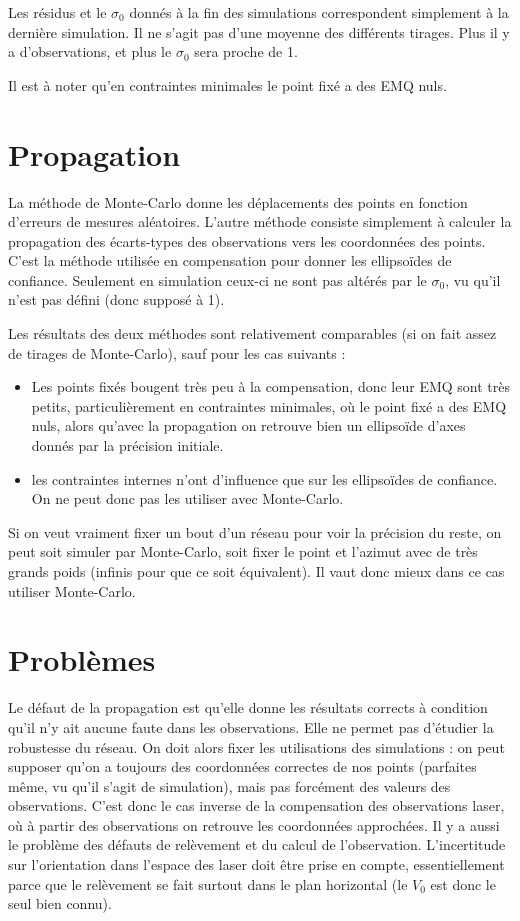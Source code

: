 \documentclass[french]{report}
\begin{document}
Les résidus et le $\sigma_0$ donnés à la fin des simulations correspondent simplement à la dernière simulation.
Il ne s'agit pas d'une moyenne des différents tirages. Plus il y a d'observations, et plus le $\sigma_0$ sera proche de 1.



Il est à noter qu'en contraintes minimales le point fixé a des EMQ nuls.

\section{Propagation}
La méthode de Monte-Carlo donne les déplacements des points en fonction d'erreurs de mesures aléatoires.
L'autre méthode consiste simplement à calculer la propagation des écarts-types des observations vers les coordonnées des points.
C'est la méthode utilisée en compensation pour donner les ellipsoïdes de confiance. Seulement en simulation
ceux-ci ne sont pas altérés par le $\sigma_0$, vu qu'il n'est pas défini (donc supposé à 1).

Les résultats des deux méthodes sont relativement comparables (si on fait assez de tirages de Monte-Carlo), sauf pour les cas suivants :
\begin{itemize}
 \item Les points fixés bougent très peu à la compensation, donc leur EMQ sont très petits, particulièrement en contraintes minimales, où le point
fixé a des EMQ nuls, alors qu'avec la propagation on retrouve bien un ellipsoïde d'axes donnés par la précision initiale.
 \item les contraintes internes n'ont d'influence que sur les ellipsoïdes de confiance. On ne peut donc pas les utiliser avec Monte-Carlo.
\end{itemize}

Si on veut vraiment fixer un bout d'un réseau pour voir la précision du reste, on peut soit simuler par Monte-Carlo,
soit fixer le point et l'azimut avec de très grands poids (infinis pour que ce soit équivalent).
Il vaut donc mieux dans ce cas utiliser Monte-Carlo.

\section{Problèmes}
Le défaut de la propagation est qu'elle donne les résultats corrects à condition qu'il n'y ait aucune faute
dans les observations. Elle ne permet pas d'étudier la robustesse du réseau.
On doit alors fixer les utilisations des simulations :  on peut supposer qu'on a toujours des coordonnées
correctes de nos points (parfaites même, vu qu'il s'agit de simulation), mais pas forcément des valeurs
des observations. C'est donc le cas inverse de la compensation des observations laser, où à partir des
observations on retrouve les coordonnées approchées.
Il y a aussi le problème des défauts de relèvement et du calcul de l'observation. L'incertitude sur l'orientation
dans l'espace des laser doit être prise en compte, essentiellement parce que le relèvement se fait surtout
dans le plan horizontal (le $V_0$ est donc le seul bien connu).
\end{document}
